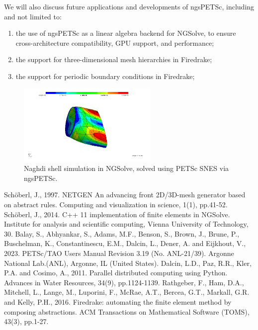 \documentclass[a4paper,11pt]{article}
\begin{document}
We will also discuss future applications and developments of ngsPETSc, including and not limited to:
\begin{enumerate}
    \item the use of ngsPETSc as a linear algebra backend for NGSolve, to ensure cross-architecture compatibility, GPU support, and performance;
    \item the support for three-dimensional mesh hierarchies in Firedrake;
    \item the support for periodic boundary conditions in Firedrake; 
\end{enumerate}
\begin{figure}[h]
    \centering
    \includegraphics[width=0.6\textwidth]{../figures/naghdi.jpg}
    \caption{Naghdi shell simulation in NGSolve, solved using PETSc SNES via ngsPETSc.}
    \label{fig:ngsPETSc}
\end{figure}
\begin{thebibliography}{9.}
\frenchspacing
{}Schöberl, J., 1997. NETGEN An advancing front 2D/3D-mesh generator based on abstract rules. Computing and visualization in science, 1(1), pp.41-52.
Schöberl, J., 2014. C++ 11 implementation of finite elements in NGSolve. Institute for analysis and scientific computing, Vienna University of Technology, 30.
Balay, S., Abhyankar, S., Adams, M.F., Benson, S., Brown, J., Brune, P., Buschelman, K., Constantinescu, E.M., Dalcin, L., Dener, A. and Eijkhout, V., 2023. PETSc/TAO Users Manual Revision 3.19 (No. ANL-21/39). Argonne National Lab.(ANL), Argonne, IL (United States).
Dalcin, L.D., Paz, R.R., Kler, P.A. and Cosimo, A., 2011. Parallel distributed computing using Python. Advances in Water Resources, 34(9), pp.1124-1139.
Rathgeber, F., Ham, D.A., Mitchell, L., Lange, M., Luporini, F., McRae, A.T., Bercea, G.T., Markall, G.R. and Kelly, P.H., 2016. Firedrake: automating the finite element method by composing abstractions. ACM Transactions on Mathematical Software (TOMS), 43(3), pp.1-27.
\end{thebibliography}

\end{document}
